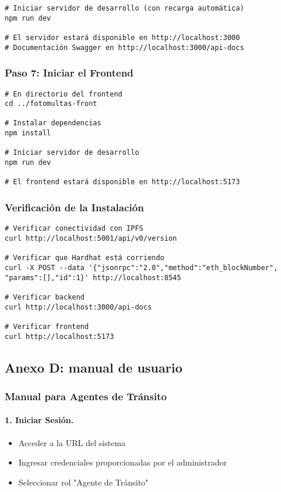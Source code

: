 \begin{verbatim}
# Iniciar servidor de desarrollo (con recarga automática)
npm run dev

# El servidor estará disponible en http://localhost:3000
# Documentación Swagger en http://localhost:3000/api-docs
\end{verbatim}

\subsubsection{Paso 7: Iniciar el Frontend}

\begin{verbatim}
# En directorio del frontend
cd ../fotomultas-front

# Instalar dependencias
npm install

# Iniciar servidor de desarrollo
npm run dev

# El frontend estará disponible en http://localhost:5173
\end{verbatim}

\subsubsection{Verificación de la Instalación}

\begin{verbatim}
# Verificar conectividad con IPFS
curl http://localhost:5001/api/v0/version

# Verificar que Hardhat está corriendo
curl -X POST --data '{"jsonrpc":"2.0","method":"eth_blockNumber",
"params":[],"id":1}' http://localhost:8545

# Verificar backend
curl http://localhost:3000/api-docs

# Verificar frontend
curl http://localhost:5173
\end{verbatim}

\subsection{Anexo D: manual de usuario}

\subsubsection{Manual para Agentes de Tránsito}

\paragraph{1. Iniciar Sesión.}
\begin{itemize}
    \item Acceder a la URL del sistema
    \item Ingresar credenciales proporcionadas por el administrador
    \item Seleccionar rol "Agente de Tránsito"
\end{itemize}

